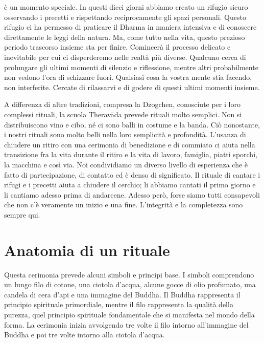 
 è un momento speciale. In questi dieci giorni abbiamo creato un rifugio sicuro osservando i precetti e rispettando reciprocamente gli spazi personali. Questo rifugio ci ha permesso di praticare il Dharma in maniera intensiva e di conoscere direttamente le leggi della natura. Ma, come tutto nella vita, questo prezioso periodo trascorso insieme sta per finire. Comincerà il processo delicato e inevitabile per cui ci disperderemo nelle realtà più diverse. Qualcuno cerca di prolungare gli ultimi momenti di silenzio e riflessione, mentre altri probabilmente non vedono l'ora di schizzare fuori. Qualsiasi cosa la vostra mente stia facendo, non interferite. Cercate di rilassarvi e di godere di questi ultimi momenti insieme.

A differenza di altre tradizioni, compresa la Dzogchen, conosciute per i loro complessi rituali, la scuola Theravāda prevede rituali molto semplici. Non si distribuiscono vino e cibo, né ci sono balli in costume e la banda. Ciò nonostante, i nostri rituali sono molto belli nella loro semplicità e profondità. L'usanza di chiudere un ritiro con una cerimonia di benedizione e di commiato ci aiuta nella transizione fra la vita durante il ritiro e la vita di lavoro, famiglia, piatti sporchi, la macchina e così via. Noi condividiamo un diverso livello di esperienza che è fatto di partecipazione, di contatto ed è denso di significato. Il rituale di cantare i rifugi e i precetti aiuta a chiudere il cerchio; li abbiamo cantati il primo giorno e li cantiamo adesso prima di andarcene. Adesso però, forse siamo tutti consapevoli che non c'è veramente un inizio e una fine. L'integrità e la completezza sono sempre qui.

\section*{Anatomia di un rituale}

\vspace*{-0.8em}
Questa cerimonia prevede alcuni simboli e principi base. I simboli comprendono un lungo filo di cotone, una ciotola d'acqua, alcune gocce di olio profumato, una candela di cera d'api e una immagine del Buddha. Il Buddha rappresenta il principio spirituale primordiale, mentre il filo rappresenta la qualità della purezza, quel principio spirituale fondamentale che si manifesta nel mondo della forma. La cerimonia inizia avvolgendo tre volte il filo intorno all'immagine del Buddha e poi tre volte intorno alla ciotola d'acqua.

